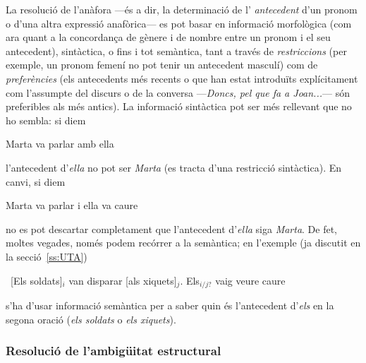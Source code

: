 La resolució de l'anàfora ---és a dir, la determinació de l'{\em
  antecedent} d'un pronom o d'una altra expressió anafòrica--- es pot
basar en informació morfològica (com ara quant a la
concordança de gènere i de nombre entre un pronom i el seu
antecedent), sintàctica, o fins i tot semàntica, tant a través de
  \emph{restriccions} (per exemple, un pronom femení no pot tenir un
  antecedent masculí) com de \emph{preferències} (els antecedents més
  recents o que han estat introduïts explícitament com l'assumpte del discurs
  o de la conversa ---\emph{Doncs, pel que fa a Joan...}--- són preferibles als més antics). La informació
sintàctica pot ser més rellevant que no ho sembla: si diem
\begin{exemple}Marta va parlar amb ella\end{exemple}
l'antecedent d'\emph{ella} no pot ser \emph{Marta} (es tracta d'una
restricció sintàctica). En canvi, si diem
\begin{exemple}Marta va parlar i ella va caure\end{exemple} 
no es pot descartar completament que l'antecedent d'\emph{ella} siga
\emph{Marta}.  De fet, moltes vegades, només podem recórrer a la
semàntica; en l'exemple (ja discutit en la secció~\ref{ss:UTA})
\begin{exemple}
\ [Els soldats]$_i$ van disparar [als xiquets]$_j$. Els$_{i/j?}$
vaig veure caure
\end{exemple}
s'ha d'usar informació semàntica per a saber quin és l'antecedent
d'\emph{els} en la segona oració (\emph{els soldats} o \emph{els
  xiquets}).



\subsubsection{Resolució de l'ambigüitat estructural}
\label{s3:resambest}

